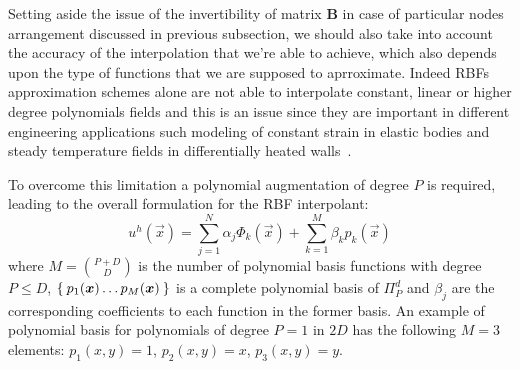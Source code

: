 Setting aside the issue of the invertibility of matrix $\boldsymbol{B}$ in case of particular nodes arrangement discussed in previous subsection, we should also take into account  the accuracy of the interpolation that we're able to achieve, which also depends upon the type of functions that we are supposed to aprroximate.
%
Indeed RBFs approximation schemes alone are not able to interpolate constant, linear or higher degree polynomials fields and this is an issue since they are important in different engineering applications such modeling of constant strain in elastic bodies and steady temperature fields in differentially heated walls~\cite{Zamolo:phd_thesis}.

To overcome this limitation a polynomial augmentation of degree $P$ is required, leading to the overall formulation for the RBF interpolant:
\begin{equation}
	\label{eq:RBF_interpolator_plus_polynomial_augmentation}
	u^h(\vec{x}) = \sum_{j=1}^{N} \alpha_j \Phi_k(\vec{x}) + \sum_{k=1}^{M} \beta_k p_k(\vec{x})
\end{equation}
where $M=\binom{P+D}{D}$ is the number of polynomial basis functions with degree $P \le D$, $\Set{p_1(\boldsymbol{x}) \dots p_M({\boldsymbol{x}})}$ is a complete polynomial basis of $\Pi_P^d$ and $\beta_j$ are the corresponding coefficients to each function in the former basis. An example of polynomial basis for polynomials of degree $P=1$ in $2D$ has the following $M=3$ elements: $p_1(x,y) = 1$, $p_2(x,y) = x$, $p_3(x,y) = y$.

